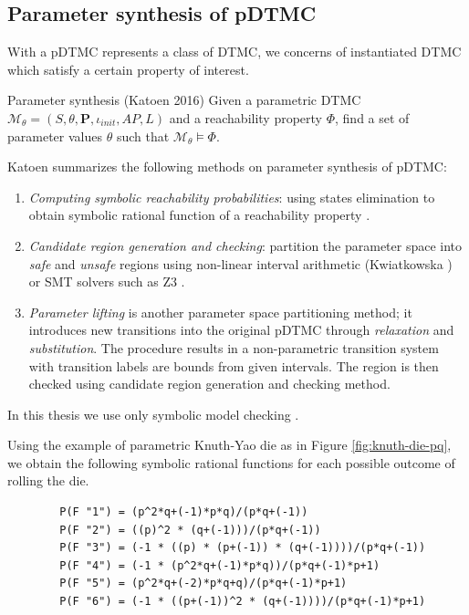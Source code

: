 \subsection{Parameter synthesis of pDTMC}
With a pDTMC represents a class of DTMC, we concerns of instantiated DTMC which satisfy a certain property of interest.
\begin{definition}{Parameter synthesis (Katoen 2016)\cite{katoen2016probabilistic}} Given a
      parametric DTMC $\mathcal{M}_\theta = (S, \theta, \mathbf{P}, \iota_{init}, AP, L)$ and a
      reachability property $\Phi$, find a set of parameter values $\theta$ such that
      $\mathcal{M}_\theta \models \Phi$.
\end{definition}
Katoen \cite{katoen2013model} summarizes the following methods on parameter synthesis of pDTMC:
\begin{enumerate}
      \item \textit{Computing symbolic reachability probabilities}: using states elimination to obtain symbolic
            rational function of a reachability property \cite{daws2004symbolic}
            \cite{hahn2011probabilistic}.
      \item \textit{Candidate region generation and checking}: partition the parameter space into
            \textit{safe} and \textit{unsafe} regions using non-linear interval arithmetic
            (Kwiatkowska \cite{kwiatkowska2006symmetry}) or SMT solvers such as Z3 \cite{de2008z3}.
      \item \textit{Parameter lifting} is another parameter space partitioning method; it introduces
            new transitions into the original pDTMC through \textit{relaxation} and
            \textit{substitution}. The procedure results in a non-parametric transition system with
            transition labels are bounds from given intervals. The region is then checked using
            candidate region generation and checking method.
\end{enumerate}
In this thesis we use only symbolic model checking \cite{daws2004symbolic}.
\begin{example}
      Using the example of parametric Knuth-Yao die as in Figure \ref{fig:knuth-die-pq}, we obtain
      the following symbolic rational functions for each possible outcome of rolling the die.
      \begin{lstlisting}
        P(F "1") = (p^2*q+(-1)*p*q)/(p*q+(-1))
        P(F "2") = ((p)^2 * (q+(-1)))/(p*q+(-1))
        P(F "3") = (-1 * ((p) * (p+(-1)) * (q+(-1))))/(p*q+(-1))
        P(F "4") = (-1 * (p^2*q+(-1)*p*q))/(p*q+(-1)*p+1)
        P(F "5") = (p^2*q+(-2)*p*q+q)/(p*q+(-1)*p+1)
        P(F "6") = (-1 * ((p+(-1))^2 * (q+(-1))))/(p*q+(-1)*p+1)
    \end{lstlisting}
\end{example}

